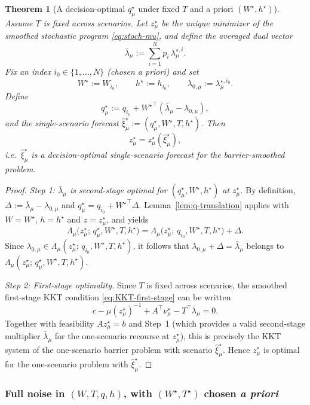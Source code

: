 \documentclass[11pt]{article}
\theoremstyle{plain}
\newtheorem{theorem}{Theorem}[section]
\theoremstyle{definition}
\theoremstyle{remark}
\begin{document}
\begin{theorem}[A decision-optimal $q_\mu^\star$ under fixed $T$ and a priori $(W^\star,h^\star)$]\label{thm:Wqh-fixedT-barrier}
Assume $T$ is fixed across scenarios. Let $z_\mu^\star$ be the unique minimizer of the smoothed stochastic
program \eqref{eq:stoch-mu}, and define the averaged dual vector
\[
\bar\lambda_\mu:=\sum_{i=1}^N p_i\,\lambda_{\mu}^{\star,i}.
\]
Fix an index $i_0\in\{1,\dots,N\}$ (chosen a priori) and set
\[
W^\star:=W_{i_0},\qquad h^\star:=h_{i_0},\qquad \lambda_{0,\mu}:=\lambda_{\mu}^{\star,i_0}.
\]
Define
\begin{equation}\label{eq:qstar-Wqh}
q_\mu^\star:=q_{i_0}+{W^\star}^\top(\bar\lambda_\mu-\lambda_{0,\mu}),
\end{equation}
and the single-scenario forecast $\hat\xi_\mu^\star:=(q_\mu^\star,W^\star,T,h^\star)$.
Then
\[
z_\mu^\star = z_\mu^\star(\hat\xi_\mu^\star),
\]
i.e.\ $\hat\xi_\mu^\star$ is a decision-optimal single-scenario forecast for the barrier-smoothed problem.
\end{theorem}

\begin{proof}
\emph{Step 1: $\bar\lambda_\mu$ is second-stage optimal for $(q_\mu^\star,W^\star,h^\star)$ at $z_\mu^\star$.}
By definition, $\Delta:=\bar\lambda_\mu-\lambda_{0,\mu}$ and $q_\mu^\star=q_{i_0}+{W^\star}^\top\Delta$.
Lemma~\ref{lem:q-translation} applies with $W=W^\star$, $h=h^\star$ and $z=z_\mu^\star$, and yields
\[
\Lambda_\mu\bigl(z_\mu^\star;\,q_\mu^\star,W^\star,T,h^\star\bigr)
=
\Lambda_\mu\bigl(z_\mu^\star;\,q_{i_0},W^\star,T,h^\star\bigr)+\Delta.
\]
Since $\lambda_{0,\mu}\in\Lambda_\mu(z_\mu^\star;\,q_{i_0},W^\star,T,h^\star)$, it follows that
$\lambda_{0,\mu}+\Delta=\bar\lambda_\mu$ belongs to
$\Lambda_\mu(z_\mu^\star;\,q_\mu^\star,W^\star,T,h^\star)$.

\emph{Step 2: First-stage optimality.}
Since $T$ is fixed across scenarios, the smoothed first-stage KKT condition \eqref{eq:KKT-first-stage} can be written
\[
c-\mu(z_\mu^\star)^{-1}+A^\top\nu_\mu^\star - T^\top\bar\lambda_\mu=0.
\]
Together with feasibility $Az_\mu^\star=b$ and Step~1 (which provides a valid second-stage multiplier
$\bar\lambda_\mu$ for the one-scenario recourse at $z_\mu^\star$), this is precisely the KKT system of the
one-scenario barrier problem with scenario $\hat\xi_\mu^\star$. Hence $z_\mu^\star$ is optimal for the
one-scenario problem with $\hat\xi_\mu^\star$.
\end{proof}

\subsubsection[Full noise in (W,T,q,h), with (W*, T*) chosen a priori]{Full noise in $(W,T,q,h)$, with $(W^\star,T^\star)$ chosen \emph{a priori}}\label{subsec:full-noise}
\end{document}
